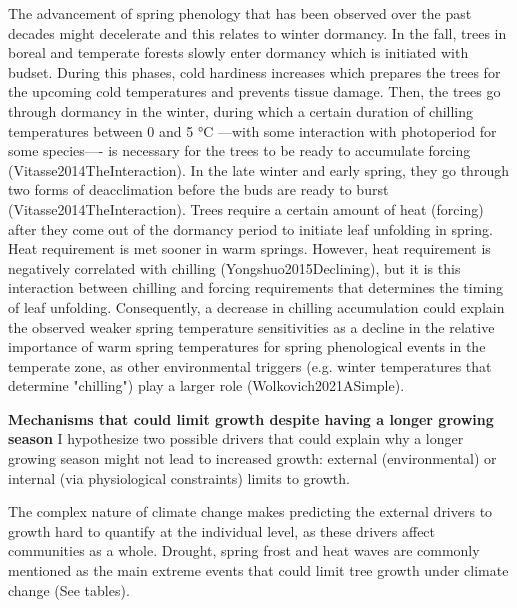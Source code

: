 \documentclass{article}
\begin{document}
The advancement of spring phenology that has been observed over the past decades might decelerate and this relates to winter dormancy. In the fall, trees in boreal and temperate forests slowly enter dormancy which is initiated with budset. During this phases, cold hardiness increases which prepares the trees for the upcoming cold temperatures and prevents tissue damage. Then, the trees go through dormancy in the winter, during which a certain duration of chilling temperatures between 0 and 5 °C ---with some interaction with photoperiod for some species---- is necessary for the trees to be ready to accumulate forcing (Vitasse2014TheInteraction). In the late winter and early spring, they go through two forms of deacclimation before the buds are ready to burst (Vitasse2014TheInteraction). Trees require a certain amount of heat (forcing) after they come out of the dormancy period to initiate leaf unfolding in spring. Heat requirement is met sooner in warm springs. However, heat requirement is negatively correlated with chilling (Yongshuo2015Declining), but it is this interaction between chilling and forcing requirements that determines the timing of leaf unfolding. Consequently, a decrease in chilling accumulation could explain the observed weaker spring temperature sensitivities as a decline in the relative importance of warm spring temperatures for spring phenological events in the temperate zone, as other environmental triggers (e.g. winter temperatures that determine "chilling") play a larger role (Wolkovich2021ASimple). 

\textbf{Mechanisms that could limit growth despite having a longer growing season}
I hypothesize two possible drivers that could explain why a longer growing season might not lead to increased growth: external (environmental) \cite{kolar_response_2016} or internal (via physiological constraints)\cite{zohner_effect_2023} limits to growth. 

The complex nature of climate change makes predicting the external drivers to growth hard to quantify at the individual level, as these drivers affect communities as a whole. Drought, spring frost and heat waves are commonly mentioned as the main extreme events that could limit tree growth under climate change \cite{tyree_xylem_2002, choat_triggers_2018, li_widespread_2023,trenberth_global_2014,intergovernmental_panel_on_climate_change_detection_2014,chiang_evidence_2021,polgar_leafout_2011,reinmann_compensatory_2023} (See tables). 
\end{document}
